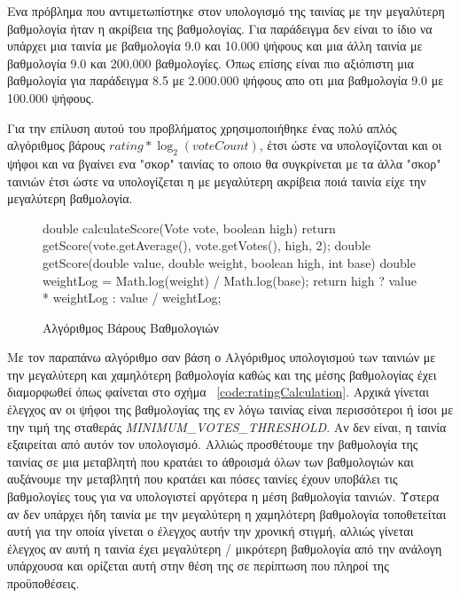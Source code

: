 Ενα πρόβλημα που αντιμετωπίστηκε στον υπολογισμό της ταινίας με την μεγαλύτερη βαθμολογία ήταν η ακρίβεια της βαθμολογίας. Για παράδειγμα δεν είναι το ίδιο να υπάρχει μια ταινία με βαθμολογία 9.0 και 10.000 ψήφους και μια άλλη ταινία με βαθμολογία 9.0 και 200.000 βαθμολογίες. Όπως επίσης είναι πιο αξιόπιστη μια βαθμολογία για παράδειγμα 8.5 με 2.000.000 ψήφους απο οτι μια βαθμολογία 9.0 με 100.000 ψήφους. 

Για την επίλυση αυτού του προβλήματος χρησιμοποιήθηκε ένας πολύ απλός αλγόριθμος βάρους $rating * \log_2(voteCount)$, έτσι ώστε να υπολογίζονται και οι ψήφοι και να βγαίνει ενα "σκορ" ταινίας το οποιο θα συγκρίνεται με τα άλλα "σκορ" ταινιών έτσι ώστε να υπολογίζεται η με μεγαλύτερη ακρίβεια ποιά ταινία είχε την μεγαλύτερη βαθμολογία.
\begin{figure}[h]
    \begin{javacode}
double calculateScore(Vote vote, boolean high) {
    return getScore(vote.getAverage(), vote.getVotes(), high, 2);
}
double getScore(double value, double weight, boolean high, int base) {
    double weightLog = Math.log(weight) / Math.log(base);
    return high ? value * weightLog : value / weightLog;
}
    \end{javacode}
    \caption{Αλγόριθμος Βάρους Βαθμολογιών}
   \label{code:logarithmicScore}
\end{figure}

Με τον παραπάνω αλγόριθμο σαν βάση ο Αλγόριθμος υπολογισμού των ταινιών με την μεγαλύτερη και χαμηλότερη βαθμολογία καθώς και της μέσης βαθμολογίας έχει διαμορφωθεί όπως φαίνεται στο σχήμα ~\ref{code:ratingCalculation}. Αρχικά γίνεται έλεγχος αν οι ψήφοι της βαθμολογίας της εν λόγω ταινίας είναι περισσότεροι ή ίσοι με την τιμή της σταθεράς {\it MINIMUM\_VOTES\_THRESHOLD}. Αν δεν είναι, η ταινία εξαιρείται από αυτόν τον υπολογισμό. Αλλιώς προσθέτουμε την βαθμολογία της ταινίας σε μια μεταβλητή που κρατάει το άθροισμά όλων των βαθμολογιών και αυξάνουμε την μεταβλητή που κρατάει και πόσες ταινίες έχουν υποβάλει τις βαθμολογίες τους για να υπολογιστεί αργότερα η μέση βαθμολογία ταινιών. Ύστερα αν δεν υπάρχει ήδη ταινία με την μεγαλύτερη η χαμηλότερη βαθμολογία τοποθετείται αυτή για την οποία γίνεται ο έλεγχος αυτήν την χρονική στιγμή, αλλιώς γίνεται έλεγχος αν αυτή η ταινία έχει μεγαλύτερη / μικρότερη βαθμολογία από την ανάλογη υπάρχουσα και ορίζεται αυτή στην θέση της σε περίπτωση που πληροί της προϋποθέσεις.


